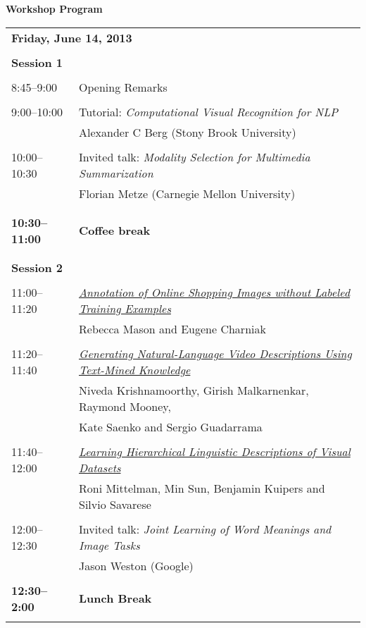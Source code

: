 \setlength{\parindent}{0in}
\setlength{\parskip}{2ex}
\renewcommand{\baselinestretch}{0.87}

\begin{center}
{\Large \bf
  Workshop Program
}
\end{center}
\vspace{3mm}
\begin{tabular}{p{20mm}p{128mm}}
\multicolumn{2}{l}{\bf Friday, June 14, 2013} \\
\\
{\bf Session 1} \\
\\
8:45--9:00 & Opening Remarks \\
\\
9:00--10:00 & Tutorial: {\em Computational Visual Recognition for NLP} \\
& Alexander C Berg (Stony Brook University) \\
\\
10:00--10:30 & Invited talk: {\em Modality Selection for Multimedia Summarization}\\ 
& Florian Metze (Carnegie Mellon University) \\
\\\\
{\bf 10:30--11:00} & {\bf Coffee break} \\
\\\\
{\bf Session 2 } \\
\\
11:00--11:20 & \hyperlink{page.1}{\em Annotation of Online Shopping Images without Labeled Training Examples}\\
         & Rebecca Mason and Eugene Charniak \\
\\

11:20--11:40 & \hyperlink{page.10}{\em Generating Natural-Language Video Descriptions Using Text-Mined Knowledge}\\
         & Niveda Krishnamoorthy, Girish Malkarnenkar, Raymond Mooney,\\
& Kate Saenko and Sergio Guadarrama \\
\\

11:40--12:00 & \hyperlink{page.20}{\em Learning Hierarchical Linguistic Descriptions of Visual Datasets}\\
         & Roni Mittelman, Min Sun, Benjamin Kuipers and Silvio Savarese \\
\\

12:00--12:30 & Invited talk: {\em Joint Learning of Word Meanings and Image Tasks}\\
&  Jason Weston (Google) \\
\\
{\bf 12:30--2:00} & {\bf Lunch Break} \\
\\
\end{tabular}
